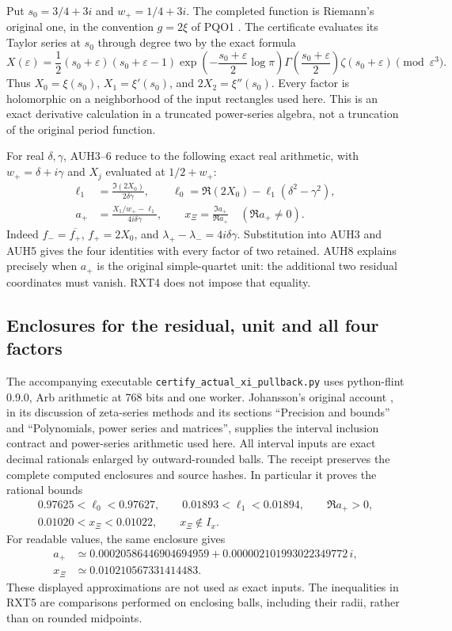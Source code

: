 \documentclass[11pt]{article}
\begin{document}
Put $s_0=3/4+3i$ and $w_+=1/4+3i$. The completed function is
Riemann's original one, in the convention $g=2\xi$ of PQO1
\cite{Cumulative,DLMFXi}. The certificate evaluates its Taylor
series at $s_0$ through degree two by the exact formula
\[
 X(\varepsilon)=\frac12(s_0+\varepsilon)(s_0+\varepsilon-1)
 \exp\!\left(-\frac{s_0+\varepsilon}{2}\log\pi\right)
 \Gamma\!\left(\frac{s_0+\varepsilon}{2}\right)
 \zeta(s_0+\varepsilon)\pmod{\varepsilon^3}.
 \tag{RXT3}
\]
Thus $X_0=\xi(s_0)$, $X_1=\xi'(s_0)$, and
$2X_2=\xi''(s_0)$. Every factor is holomorphic on a
neighborhood of the input rectangles used here. This is an exact
derivative calculation in a truncated power-series algebra, not
a truncation of the original period function.

For real $\delta,\gamma$, AUH3--6 reduce to the following exact
real arithmetic, with $w_+=\delta+i\gamma$ and $X_j$ evaluated
at $1/2+w_+$:
\[
\begin{aligned}
 \ell_1&=\frac{\Im(2X_0)}{2\delta\gamma},\qquad
 \ell_0=\Re(2X_0)-\ell_1(\delta^2-\gamma^2),\\
 a_+&=\frac{X_1/w_+-\ell_1}{4i\delta\gamma},\qquad
 x_\Xi=\frac{\Im a_+}{\Re a_+}\quad(\Re a_+\ne0).
\end{aligned}\tag{RXT4}
\]
Indeed $f_-=\overline{f_+}$, $f_+=2X_0$, and
$\lambda_+-\lambda_-=4i\delta\gamma$. Substitution into
AUH3 and AUH5 gives the four identities with every factor of two
retained. AUH8 explains precisely when $a_+$ is the original
simple-quartet unit: the additional two residual coordinates must
vanish. RXT4 does not impose that equality.

\subsection{Enclosures for the residual, unit and all four factors}

The accompanying executable \texttt{certify\_actual\_xi\_pullback.py}
uses python-flint 0.9.0, Arb arithmetic at 768 bits and one worker.
Johansson's original account \cite{human:arb2016}, in its discussion
of zeta-series methods and its sections ``Precision and bounds''
and ``Polynomials, power series and matrices'', supplies the
interval inclusion contract and power-series arithmetic used here.
All interval inputs are exact decimal rationals enlarged by
outward-rounded balls. The receipt preserves the complete computed
enclosures and source hashes. In particular it proves the rational
bounds
\[
\begin{gathered}
 0.97625<\ell_0<0.97627,\qquad
 0.01893<\ell_1<0.01894,\qquad \Re a_+>0,\\
 0.01020<x_\Xi<0.01022,\qquad x_\Xi\notin I_x.
\end{gathered}\tag{RXT5}
\]
For readable values, the same enclosure gives
\[
 \begin{aligned}
 a_+&\simeq0.00020586446904694959+
 0.000002101993022349772\,i,\\
 x_\Xi&\simeq0.010210567331414483.
 \end{aligned}
\]
These displayed approximations are not used as exact inputs.
The inequalities in RXT5 are comparisons performed on enclosing
balls, including their radii, rather than on rounded midpoints.
\end{document}
